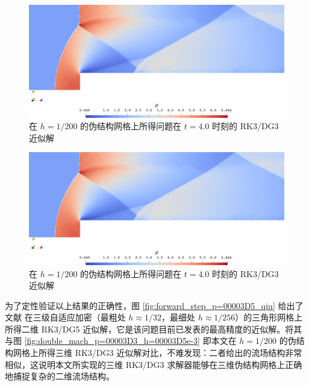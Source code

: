 \begin{figure}[h!]
\begin{centering}
\includegraphics[width=1\textwidth,height=0.28\textheight]{../mdpi/figures/forward_step/p=3_t=40e-1}
\par\end{centering}
\caption{\label{fig:forward_step_p=00003D3_t=00003D40e-1}在 $h=1/200$ 的伪结构网格上所得问题在
$t=4.0$ 时刻的 RK3/DG3 近似解}
\end{figure}

\begin{figure}[h!]
\begin{centering}
\includegraphics[width=1\textwidth,height=0.28\textheight]{../mdpi/figures/forward_step/p=3_t=40e-1}
\par\end{centering}
\caption{\label{fig:forward_step_p=00003D3_t=00003D40e-1-1}在 $h=1/200$ 的伪结构网格上所得问题在
$t=4.0$ 时刻的 RK3/DG3 近似解}
\end{figure}

为了定性验证以上结果的正确性，图 \ref{fig:forward_step_p=00003D5_qiu} 给出了文献 \cite{Giri_2019}
在三级自适应加密（最粗处 $h\approx1/32$，最细处 $h\approx1/256$）的三角形网格上所得二维 RK3/DG5
近似解，它是该问题目前已发表的最高精度的近似解。将其与图 \ref{fig:double_mach_p=00003D3_h=00003D5e-3}
即本文在 $h=1/200$ 的伪结构网格上所得三维 RK3/DG3 近似解对比，不难发现：二者给出的流场结构非常相似，这说明本文所实现的三维
RK3/DG3 求解器能够在三维伪结构网格上正确地捕捉复杂的二维流场结构。

